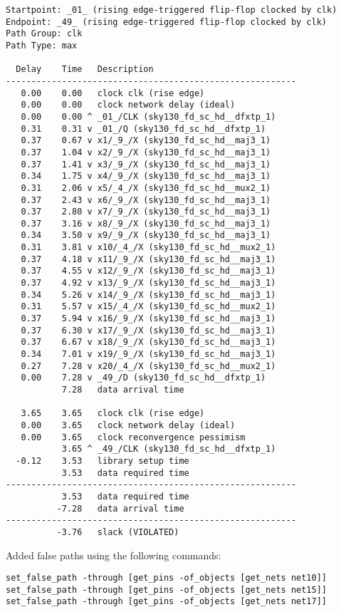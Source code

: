 \documentclass[12pt,a4paper]{article}
\begin{document}
\begin{verbatim}
Startpoint: _01_ (rising edge-triggered flip-flop clocked by clk)
Endpoint: _49_ (rising edge-triggered flip-flop clocked by clk)
Path Group: clk
Path Type: max

  Delay    Time   Description
---------------------------------------------------------
   0.00    0.00   clock clk (rise edge)
   0.00    0.00   clock network delay (ideal)
   0.00    0.00 ^ _01_/CLK (sky130_fd_sc_hd__dfxtp_1)
   0.31    0.31 v _01_/Q (sky130_fd_sc_hd__dfxtp_1)
   0.37    0.67 v x1/_9_/X (sky130_fd_sc_hd__maj3_1)
   0.37    1.04 v x2/_9_/X (sky130_fd_sc_hd__maj3_1)
   0.37    1.41 v x3/_9_/X (sky130_fd_sc_hd__maj3_1)
   0.34    1.75 v x4/_9_/X (sky130_fd_sc_hd__maj3_1)
   0.31    2.06 v x5/_4_/X (sky130_fd_sc_hd__mux2_1)
   0.37    2.43 v x6/_9_/X (sky130_fd_sc_hd__maj3_1)
   0.37    2.80 v x7/_9_/X (sky130_fd_sc_hd__maj3_1)
   0.37    3.16 v x8/_9_/X (sky130_fd_sc_hd__maj3_1)
   0.34    3.50 v x9/_9_/X (sky130_fd_sc_hd__maj3_1)
   0.31    3.81 v x10/_4_/X (sky130_fd_sc_hd__mux2_1)
   0.37    4.18 v x11/_9_/X (sky130_fd_sc_hd__maj3_1)
   0.37    4.55 v x12/_9_/X (sky130_fd_sc_hd__maj3_1)
   0.37    4.92 v x13/_9_/X (sky130_fd_sc_hd__maj3_1)
   0.34    5.26 v x14/_9_/X (sky130_fd_sc_hd__maj3_1)
   0.31    5.57 v x15/_4_/X (sky130_fd_sc_hd__mux2_1)
   0.37    5.94 v x16/_9_/X (sky130_fd_sc_hd__maj3_1)
   0.37    6.30 v x17/_9_/X (sky130_fd_sc_hd__maj3_1)
   0.37    6.67 v x18/_9_/X (sky130_fd_sc_hd__maj3_1)
   0.34    7.01 v x19/_9_/X (sky130_fd_sc_hd__maj3_1)
   0.27    7.28 v x20/_4_/X (sky130_fd_sc_hd__mux2_1)
   0.00    7.28 v _49_/D (sky130_fd_sc_hd__dfxtp_1)
           7.28   data arrival time

   3.65    3.65   clock clk (rise edge)
   0.00    3.65   clock network delay (ideal)
   0.00    3.65   clock reconvergence pessimism
           3.65 ^ _49_/CLK (sky130_fd_sc_hd__dfxtp_1)
  -0.12    3.53   library setup time
           3.53   data required time
---------------------------------------------------------
           3.53   data required time
          -7.28   data arrival time
---------------------------------------------------------
          -3.76   slack (VIOLATED)
\end{verbatim}

\noindent Added false paths using the following commands:
\begin{verbatim}
set_false_path -through [get_pins -of_objects [get_nets net10]]
set_false_path -through [get_pins -of_objects [get_nets net15]]
set_false_path -through [get_pins -of_objects [get_nets net17]]
\end{verbatim}
\end{document}
